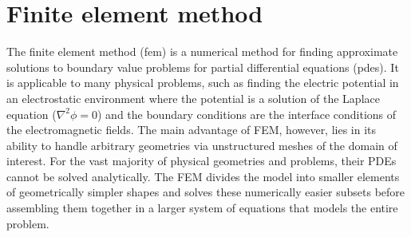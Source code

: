 \section{Finite element method}
The finite element method (\ac{fem}) is a numerical method for finding approximate solutions to boundary value problems for partial differential equations (\ac{pde}s). It is applicable to many physical problems, such as finding the electric potential in an electrostatic environment where the potential is a solution of the Laplace equation ($\nabla^2\phi=0$) and the boundary conditions are the interface conditions of the electromagnetic fields.  The main advantage of FEM, however, lies in its ability to handle arbitrary geometries via unstructured meshes of the domain of interest. For the vast majority of physical geometries and problems, their PDEs cannot be solved analytically. The FEM divides the model into smaller elements of geometrically simpler shapes and solves these numerically easier subsets before assembling them together in a larger system of equations that models the entire problem.




